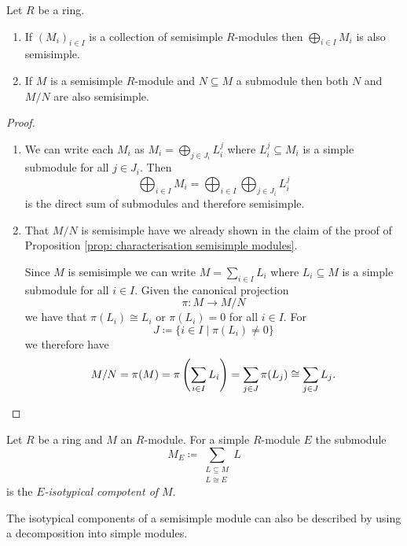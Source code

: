 \begin{lem}\label{lem: inherit semisimple}
 Let $R$ be a ring.
 \begin{enumerate}[label=\emph{\alph*)},leftmargin=*]
  \item
   If $(M_i)_{i \in I}$ is a collection of semisimple $R$-modules then $\bigoplus_{i \in I} M_i$ is also semisimple.
  \item
   If $M$ is a semisimple $R$-module and $N \subseteq M$ a submodule then both $N$ and $M/N$ are also semisimple.
 \end{enumerate}
\end{lem}
\begin{proof}
 \begin{enumerate}[label=\emph{\alph*)},leftmargin=*]
  \item
   We can write each $M_i$ as $M_i = \bigoplus_{j \in J_i} L^j_i$ where $L^j_i \subseteq M_i$ is a simple submodule for all $j \in J_i$. Then
   \[
    \bigoplus_{i \in I} M_i = \bigoplus_{i \in I} \bigoplus_{j \in J_i} L^j_i
   \]
   is the direct sum of submodules and therefore semisimple.
  \item
   That $M/N$ is semisimple have we already shown in the claim of the proof of Proposition \ref{prop: characterisation semisimple modules}.
   
   Since $M$ is semisimple we can write $M = \sum_{i \in I} L_i$ where $L_i \subseteq M$ is a simple submodule for all $i \in I$. Given the canonical projection
   \[
    \pi \colon M \to M/N
   \]
   we have that $\pi(L_i) \cong L_i$ or $\pi(L_i) = 0$ for all $i \in I$. For
   \[
    J \coloneqq \{i \in I \mid \pi(L_i) \neq 0\}
   \]
   we therefore have
   \[
    M/N = \pi(M) = \pi\left( \sum_{i \in I} L_i \right) = \sum_{j \in J} \pi(L_j) \cong \sum_{j \in J} L_j.
    \qedhere
   \]
 \end{enumerate}
\end{proof}


\begin{defi}
 Let $R$ be a ring and $M$ an $R$-module. For a simple $R$-module $E$ the submodule
 \[
  M_E \coloneqq \sum_{\substack{L \subseteq M \\ L \cong E}} L
 \]
 is the \emph{$E$-isotypical compotent of $M$}.
\end{defi}


The isotypical components of a semisimple module can also be described by using a decomposition into simple modules.



